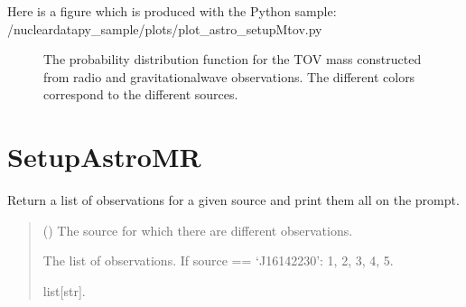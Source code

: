 \documentclass[letterpaper,10pt,english]{sphinxmanual}
\begin{document}
\sphinxAtStartPar
Here is a figure which is produced with the Python sample: /nucleardatapy\_sample/plots/plot\_astro\_setupMtov.py

\begin{figure}[htbp]
\centering
\capstart

\noindent{}
\caption{The probability distribution function for the TOV mass constructed from radio and gravitational\sphinxhyphen{}wave observations.
The different colors correspond to the different sources.}\label{\detokenize{source/api/setup_astro_mtov:id1}}\end{figure}

\sphinxstepscope


\section{SetupAstroMR}
\label{\detokenize{source/api/setup_astro_mr:setupastromr}}\label{\detokenize{source/api/setup_astro_mr::doc}}\label{\detokenize{source/api/setup_astro_mr:module-nucleardatapy.astro.setup_mr}}

\begin{fulllineitems}
\label{\detokenize{source/api/setup_astro_mr:nucleardatapy.astro.setup_mr.mr_obss}}
\pysigstartsignatures
{}
\pysigstopsignatures
\sphinxAtStartPar
Return a list of observations for a given source and print them all on the prompt.
\begin{quote}\begin{description}
\sphinxAtStartPar
{} () \textendash{} The source for which there are different observations.

\sphinxAtStartPar
The list of observations.     If source == ‘J1614\textendash{}2230’: 1, 2, 3, 4, 5.

\sphinxAtStartPar
list{[}str{]}.

\end{description}\end{quote}

\end{fulllineitems}
\end{document}
